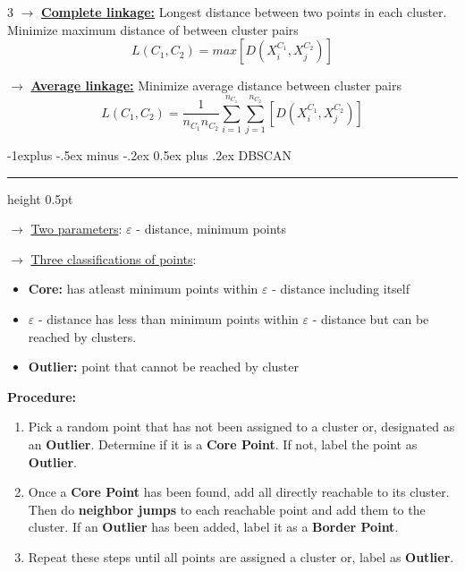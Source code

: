 \documentclass[letterpaper, 10.5pt,landscape]{article}
\makeatletter
\renewcommand{\subsection}{\@startsection{subsection}{2}{0mm}%
                                {-1explus -.5ex minus -.2ex}%
                                {0.5ex plus .2ex}%
                                {\normalfont\normalsize\bfseries}}
\makeatother
\begin{document}
\begin{multicols*}{3}
$\rightarrow$ \textbf{\underline{Complete linkage:}} Longest distance between two points in each cluster. Minimize maximum distance of between cluster pairs
\vspace{-3pt}
\[\boxed{L(C_{1}, C_{2}) = max\left[D \left(X^{C_1}_{i}, X^{C_2}_{j}\right) \right]}  \]


$\rightarrow$ \textbf{\underline{Average linkage:}} Minimize average distance between cluster pairs
\vspace{-3pt}
\[\boxed{L(C_{1}, C_{2}) = \frac{1}{n_{C_1} n_{C_2}} \sum^{n_{C_1}}_{i=1} \sum^{n_{C_2}}_{j=1}  \left[D \left(X^{C_1}_{i}, X^{C_2}_{j}\right) \right]}  \]

\subsection{DBSCAN} {\color{teal}\hrule height 0.5pt} \smallskip

$\rightarrow$ \underline{Two parameters}: $\varepsilon$ - distance, minimum points 

\vspace{2pt}

$\rightarrow$ \underline{Three classifications of points}:

\begin{itemize}
    \vspace{-3pt}
    \item \textbf{Core:} has atleast minimum points within  $\varepsilon$ - distance including itself
    \vspace{-3pt}
    \item $\varepsilon$ - distance has less than minimum points within $\varepsilon$ - distance but can be reached by clusters.
    \vspace{-3pt}
    \item \textbf{Outlier:} point that cannot be reached by cluster
\end{itemize}
\textbf{Procedure:}
\begin{enumerate}
    \item Pick a random point that has not been assigned to a cluster or, designated as an \textbf{Outlier}. Determine if it is a \textbf{Core Point}. If not, label the point as\textbf{ Outlier}.
    \item Once a \textbf{Core Point} has been found, add all directly reachable to its cluster. Then do \textbf{neighbor jumps} to each reachable point and add them to the cluster. If an \textbf{Outlier} has been added, label it as a \textbf{Border Point}.
    \item Repeat these steps until all points are assigned a cluster or, label as \textbf{Outlier}.
\end{enumerate}






\end{multicols*}
\end{document}
